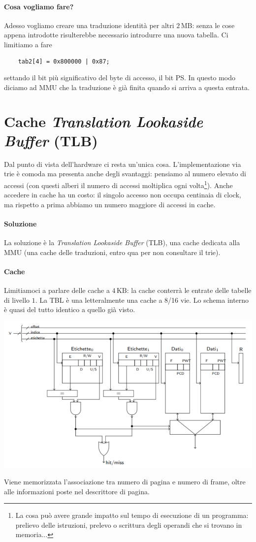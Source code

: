 \documentclass[11pt]{report}
\theoremstyle{definition}
\begin{document}
\paragraph{Cosa vogliamo fare?} Adesso vogliamo creare una traduzione identità per altri $2\,\text{MB}$: senza le cose appena introdotte risulterebbe necessario introdurre una nuova tabella. Ci limitiamo a fare
\begin{verbatim}
	tab2[4] = 0x800000 | 0x87;
\end{verbatim}
settando il bit più significativo del byte di accesso, il bit PS. In questo modo diciamo ad MMU che la traduzione è già finita quando si arriva a questa entrata.


\section{Cache \emph{Translation Lookaside Buffer} (TLB)}
Dal punto di vista dell'hardware ci resta un'unica cosa. L'implementazione via trie è comoda ma presenta anche degli svantaggi: pensiamo al numero elevato di accessi (con questi alberi il numero di accessi moltiplica ogni volta\footnote{La cosa può avere grande impatto sul tempo di esecuzione di un programma: prelievo delle istruzioni, prelevo o scrittura degli operandi che si trovano in memoria...}). Anche accedere in cache ha un costo: il singolo accesso non occupa centinaia di clock, ma rispetto a prima abbiamo un numero maggiore di accessi in cache. 
\paragraph{Soluzione} La soluzione è la \emph{Translation Lookaside Buffer} (TLB), una cache dedicata alla MMU (una cache delle traduzioni, entro qua per non consultare il trie). 
\paragraph{Cache} Limitiamoci a parlare delle cache a $4\,\text{KB}$: la cache conterrà le entrate delle tabelle di livello $1$. La TBL è una letteralmente una cache a 8/16 vie. Lo schema interno è quasi del tutto identico a quello già visto.
\begin{center}
	\includegraphics[scale=.8]{img/228.PNG}
\end{center}
Viene memorizzata l'associazione tra numero di pagina e numero di frame, oltre alle informazioni poste nel descrittore di pagina.
\end{document}
